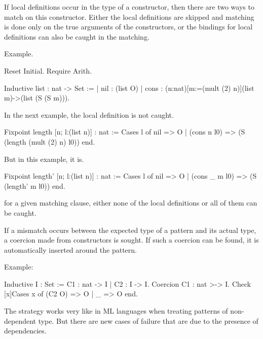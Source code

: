 
If local definitions occur in the type of a constructor, then there
are two ways to match on this constructor. Either the local
definitions are skipped and matching is done only on the true arguments
of the constructors, or the bindings for local definitions can also
be caught in the matching.

Example.

\begin{coq_eval}
Reset Initial.
Require Arith.
\end{coq_eval}

\begin{coq_example*}
Inductive list : nat -> Set :=
| nil : (list O)
| cons : (n:nat)[m:=(mult (2) n)](list m)->(list (S (S m))).
\end{coq_example*}

In the next example, the local definition is not caught.

\begin{coq_example}
Fixpoint length [n; l:(list n)] : nat :=
  Cases l of
     nil => O
  | (cons n l0) => (S (length (mult (2) n) l0))
  end.
\end{coq_example}

But in this example, it is.

\begin{coq_example}
Fixpoint length' [n; l:(list n)] : nat :=
  Cases l of
     nil => O
  | (cons _ m l0) => (S (length' m l0))
  end.
\end{coq_example}

\Rem for a given matching clause, either none of the local
definitions or all of them can be caught.


If a mismatch occurs between the expected type of a pattern and its
actual type, a coercion made from constructors is sought. If such a
coercion can be found, it is automatically inserted around the
pattern.

Example:

\begin{coq_example}
Inductive I : Set :=
  C1 : nat -> I
| C2 : I -> I.
Coercion C1 : nat >-> I.
Check [x]Cases x of (C2 O) => O | _ => O end.
\end{coq_example}


\label{limitations}
The strategy works very like in ML languages when treating
patterns of non-dependent type.  
But there are new cases of failure that are due to the presence of 
dependencies. 

